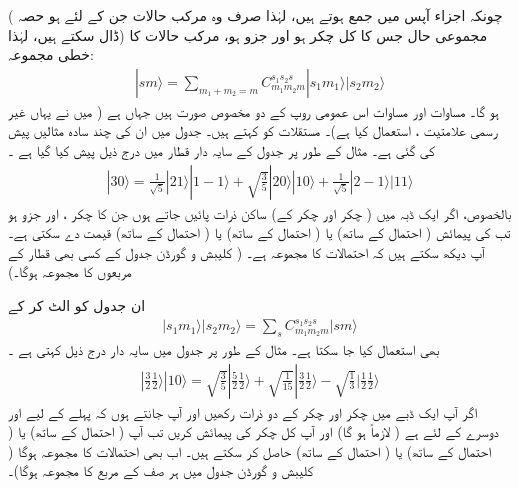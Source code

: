 ( چونکہ  اجزاء آپس میں جمع ہوتے ہیں،  لہٰذا صرف وہ مرکب حالات جن کے لئے  ہو  حصہ ڈال سکتے ہیں، لہٰذا)     مجموعی  حال  جس کا کل چکر  ہو  اور  جزو   ہو،    مرکب حالات  کا خطی مجموعہ:
\begin{align}\label{مساوات_تین_ابعادی_کلیبش_گورڈن_خطی_مجموعہ}
|sm\rangle=\sum_{m_1+m_2=m}C_{m_1m_2m}^{s_1s_2s} |s_1m_1\rangle |s_2 m_2\rangle
\end{align}
ہو گا۔ مساوات    اور مساوات   اس عمومی روپ کے دو مخصوص صورت ہیں جہاں  ہے ( میں نے یہاں غیر رسمی علامتیت ،
   استعمال کیا ہے)۔ مستقلات  کو
    کہتے ہیں۔  جدول   میں ان کی  چند سادہ  مثالیں  پیش کی گئی ہے۔ مثال کے طور پر  جدول کے سایہ دار قطار میں درج ذیل پیش کیا گیا ہے ۔
\begin{align*}
| 3 0 \rangle = \tfrac{1}{\sqrt{5}} | 2 1 \rangle | 1 - 1 \rangle + \sqrt{\tfrac{3}{5}} | 2 0 \rangle | 1 0 \rangle + \tfrac{1}{\sqrt{5}} | 2 - 1 \rangle | 1 1 \rangle
\end{align*}
بالخصوص،  اگر ایک ڈبہ میں (  چکر اور   چکر کے)  ساکن ذرات پائیں جاتے ہوں جن کا  چکر ،  اور  جزو   ہو تب  کی پیمائش  ( احتمال کے ساتھ)   یا  ( احتمال کے ساتھ)     یا (  احتمال کے ساتھ)  قیمت دے سکتی ہے۔ آپ  دیکھ سکتے ہیں کہ احتمالات کا مجموعہ    ہے۔ (   کلیبش و گورڈن   جدول کے کسی بھی قطار کے  مربعوں  کا مجموعہ    ہوگا۔)

 ان جدول کو الٹ  کر کے
\begin{align} 
| s_1 m_1 \rangle | s_2 m_2 \rangle = \sum_s C_{m_1 m_2 m}^{s_1 s_2 s} | s m \rangle
\end{align}
 بھی استعمال کیا جا سکتا ہے۔ مثال کے طور پر  جدول میں سایہ دار  درج ذیل کہتی ہے ۔
\begin{align*}
| \tfrac{3}{2} \tfrac{1}{2} \rangle | 1 0 \rangle = \sqrt{\tfrac{3}{5}} | \tfrac{5}{2} \tfrac{1}{2} \rangle + \sqrt{\tfrac{1}{15}} | \tfrac{3}{2} \tfrac{1}{2} \rangle - \sqrt{\tfrac{1}{3}} | \tfrac{1}{2} \tfrac{1}{2} \rangle
\end{align*}
اگر آپ ایک ڈبے میں  چکر اور   چکر کے دو ذرات رکھیں  اور آپ جانتے ہوں  کہ پہلے کے لیے  اور دوسرے کے لئے  ہے  (  لازماً   ہو گا) اور آپ کل چکر  کی پیمائش کریں تب آپ  ( احتمال کے ساتھ)   یا (  احتمال کے ساتھ)   یا (  احتمال کے ساتھ)   حاصل کر سکتے ہیں۔ اب بھی احتمالات کا مجموعہ   ہوگا (  کلیبش و گورڈن جدول میں ہر صف کے مربع کا مجموعہ  ہوگا)۔

